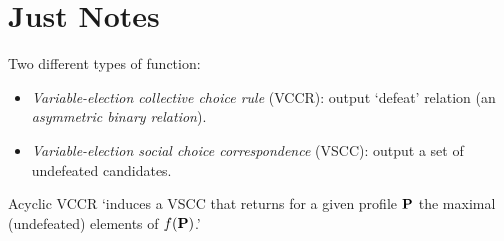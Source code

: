 \chapter{Just Notes}

Two different types of function: 
\begin{itemize}
    \item \emph{Variable-election collective choice rule} (VCCR): output `defeat' relation (an \emph{asymmetric binary relation}).
    \item \emph{Variable-election social choice correspondence} (VSCC): output a set of undefeated candidates.
\end{itemize}

Acyclic VCCR `induces a VSCC that returns for a given profile $\mathbf{P}$ the maximal (undefeated) elements of $f (\mathbf{P})$.'